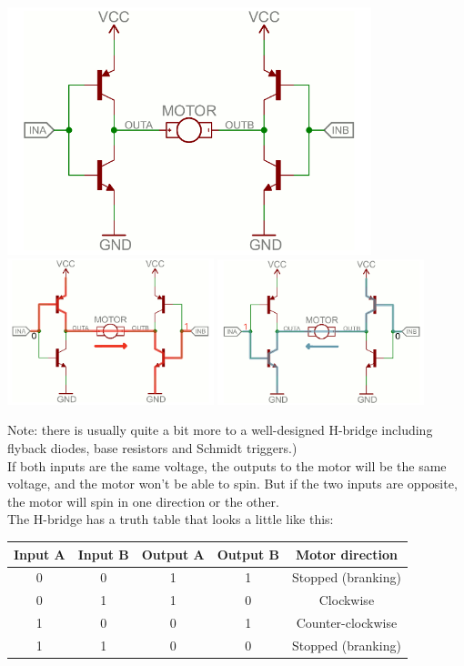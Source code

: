 \documentclass[a4paper, 11pt]{article} %
\begin{document}
\begin{center}
\includegraphics[width=300pt]{tran20a}
\includegraphics[width=170pt]{tran20b}
\includegraphics[width=170pt]{tran20c}
\end{center}

Note: there is usually quite a bit more to a well-designed H-bridge including flyback diodes, base resistors and Schmidt triggers.)\\

If both inputs are the same voltage, the outputs to the motor will be the same voltage, and the motor won't be able to spin. But if the two inputs are opposite, the motor will spin in one direction or the other.\\

The H-bridge has a truth table that looks a little like this:\\

\begin{center}
 \begin{tabular}{|c|c|c|c|c|}
\hline 
\textbf{Input A} & \textbf{Input B} & \textbf{Output A} & \textbf{Output B} & \textbf{Motor direction} \\ 
\hline 
0 & 0 & 1 & 1 & Stopped (branking) \\ 
\hline 
0 & 1 & 1 & 0 & Clockwise \\ 
\hline 
1 & 0 & 0 & 1 & Counter-clockwise \\ 
\hline 
1 & 1 & 0 & 0 & Stopped (branking) \\ 
\hline 
\end{tabular}
 \end{center} 
\end{document}
